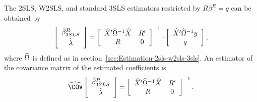 The 2SLS, W2SLS, and standard 3SLS estimators
restricted by $R \beta^R = q$ can be obtained by
\begin{equation}
   \left[ \begin{array}{c}
      \hat{\beta}^R_{3SLS} \\[0.2em] \hat{\lambda}
   \end{array} \right]
   =
   \left[ \begin{array}{cc}
      \widehat{X}' \widehat{\Omega}^{-1} \widehat{X} & R' \\
      R & 0
   \end{array} \right]^{-1}
   \cdot
   \left[ \begin{array}{c}
      \widehat{X}' \widehat{\Omega}^{-1} y \\ q
   \end{array} \right] ,
   \label{eq:2sls-w2sls-3sls-r}
\end{equation}
where $\widehat{\Omega}$ is defined as in section~\ref{sec:Estimation-2sls-w2sls-3sls}.
An estimator of the covariance matrix of the estimated coefficients is
\begin{equation}
   \COVHat
   \left[ \begin{array}{c}
      \bHat^R_{3SLS} \\[0.2em] \lHat
   \end{array} \right] 
   = 
   \left[ \begin{array}{cc}
      \XHat' \OHat^{-1} \XHat & R' \\
      R & 0
   \end{array} \right]^{-1} .
   \label{eq:cov-2sls-w2sls-3sls-r}
\end{equation}

